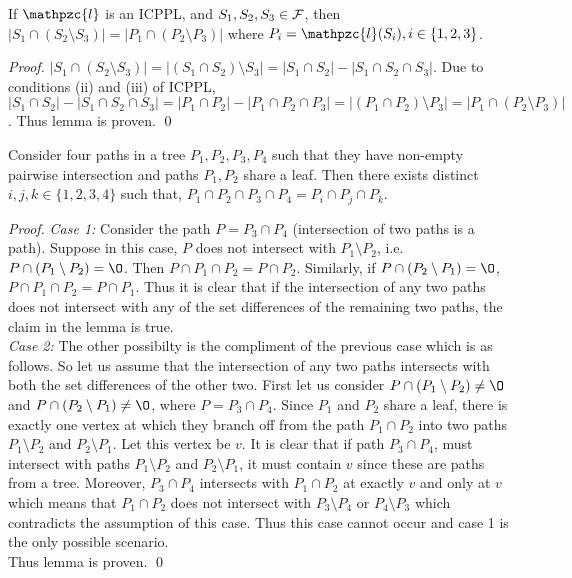 \documentclass{llncs}
\def\cF{{\cal F}}
\def\cl{\mathpzc{l}}
\begin{document}
\begin{lemma}
  \label{lem:setminuscard}
  If $\cl$ is an ICPPL, and $S_1, S_2, S_3 \in
  \cF$, then $|S_1 \cap (S_2 \setminus S_3)| = |P_1 \cap (P_2
   \setminus P_3)|$ where $P_i = \cl(S_i), i \in \{1, 2, 3\}$.
\end{lemma}
\begin{proof}
  $|S_1 \cap (S_2 \setminus S_3)| = |(S_1 \cap S_2) \setminus S_3| =
  |S_1 \cap S_2| - |S_1 \cap S_2 \cap S_3|$. Due to conditions (ii)
  and (iii) of ICPPL, $|S_1 \cap S_2| - |S_1 \cap S_2 \cap S_3| = |P_1
  \cap P_2| - |P_1 \cap P_2 \cap P_3| = |(P_1 \cap P_2) \setminus P_3|
  = |P_1 \cap (P_2 \setminus P_3)|$. Thus lemma is proven. \qed
\end{proof}

\begin{lemma}
  \label{lem:fourpaths} Consider four paths in a tree $P_1, P_2, P_3,
  P_4$ such that they have non-empty pairwise intersection and paths $P_1,
  P_2$ share a leaf. Then there exists distinct $i, j, k \in
  \{1,2,3,4\}$ such that, $P_1 \cap P_2 \cap P_3 \cap P_4 = P_i \cap
  P_j \cap P_k$.
\end{lemma}
\begin{proof}
  {\em Case 1:} Consider the path $P = P_3 \cap P_4$ (intersection of
  two paths is a path).
  Suppose in this case, $P$ does not intersect with $P_1 \setminus
  P_2$, i.e. $P \cap (P_1 \setminus P_2) = \O$. Then $P \cap P_1 \cap
  P_2 = P \cap P_2$. Similarly, if $P \cap (P_2 \setminus P_1) = \O$,
  $P \cap P_1 \cap P_2 = P \cap P_1$. Thus it is clear that if the
  intersection of any two paths does not intersect with any of the set
  differences of
  the remaining two paths, the claim in the lemma is true.\\
  {\em Case 2:} The other possibilty is the compliment of the previous
  case which is as follows. So let us assume that the intersection of
  any two paths intersects with both the set differences of the other
  two. First let us consider $P \cap (P_1 \setminus P_2) \ne \O$ and
  $P \cap (P_2 \setminus P_1) \ne \O$, where $P = P_3 \cap P_4$. Since
  $P_1$ and $P_2$ share a leaf, there is exactly one vertex at which
  they branch off from the path $P_1 \cap P_2$ into two paths $P_1
  \setminus P_2$ and $P_2 \setminus P_1$. Let this vertex be $v$. It
  is clear that if path $P_3 \cap P_4$, must intersect with paths $P_1
  \setminus P_2$ and $P_2 \setminus P_1$, it must contain $v$ since
  these are paths from a tree. Moreover, $P_3 \cap P_4$ intersects
  with $P_1 \cap P_2$ at exactly $v$ and only at $v$ which means that
  $P_1 \cap P_2$ does not intersect with $P_3 \setminus P_4$ or $P_4
  \setminus P_3$ which contradicts the assumption of this case. Thus
  this  case cannot occur and case 1 is the only possible scenario. \\
  Thus lemma is proven. \qed
\end{proof}
\end{document}
